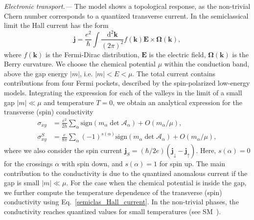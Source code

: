 \documentclass[aps,prb,twocolumn,amsmath,amssymb,floatfix]{revtex4-2}
\begin{document}
\textit{Electronic transport.---}
The model shows a topological response, as the non-trivial Chern number corresponds to a quantized transverse current.
In the semiclassical limit the Hall current has the form~\cite{PhysRevLett.99.236809,RevModPhys.82.1959}
\begin{equation}\label{semiclas_Hall_current}
    \mathbf{j} = \frac{e^2}{\hbar} \int  \frac{\mathrm{d}^2 \mathbf{k}}{(2\pi)^2} f(\mathbf{k}) \mathbf{E} \times \mathbf{\Omega}(\mathbf{k}),
\end{equation}
where $f(\mathbf{k})$ is the Fermi-Dirac distribution, $\mathbf{E}$ is the electric field, $\mathbf{\Omega}(\mathbf{k})$ is the Berry curvature. We choose the chemical potential $\mu$ within the conduction band, above the gap energy $|m|$, i.e. $|m| < E < \mu$. 
The total current contains contributions from four Fermi pockets, described by the spin-polarized low-energy models.
Integrating the expression for each of the valleys in the limit of a small gap $|m| \ll \mu$ and temperature $T=0$, we obtain an analytical expression for the transverse (spin) conductivity
\begin{align}
    \sigma_{xy} &= \frac{e^2}{2h} \sum_{\alpha} \text{sign} (m_{\alpha} \det \mathcal{A}_{\alpha}) +O(m_{\alpha}/\mu),\\
    \sigma_{xy}^S &= \frac{e}{8\pi} \sum_{\alpha} (-1)^{s(\alpha)}\text{sign} (m_{\alpha} \det \mathcal{A}_{\alpha})+ O(m_{\alpha}/\mu),
\end{align}
where we also consider the
spin current $\mathbf{j}_S = (\hbar/2e)(\mathbf{j}_{\downarrow}-\mathbf{j}_{\uparrow})$. Here, $s(\alpha) = 0$ for the crossings $\alpha$ with spin down, and $s(\alpha) = 1$ for spin up. The main contribution to the conductivity is due to the quantized anomalous current if the gap is small $|m| \ll \mu$. 
For the case when the chemical potential is
inside the gap,
we further compute the temperature dependence of the transverse (spin) conductivity using Eq.~\eqref{semiclas_Hall_current}. In the non-trivial phases, the conductivity reaches quantized values for small temperatures (see SM~\cite{sm_note}).
\end{document}
